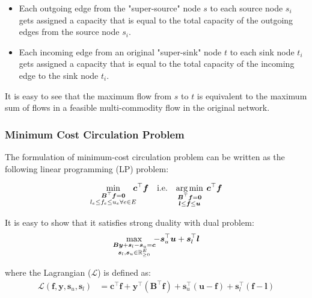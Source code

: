 \documentclass{article} %
\theoremstyle{bfnote}
\begin{document}
\begin{itemize}
	\item Each outgoing edge from the "super-source" node $s$ to each source
	node $s_i$ gets assigned a capacity that is equal to the total capacity of the
	outgoing edges from the source node $s_i$.
	
	\item Each incoming edge from an original "super-sink" node $t$ to each sink
	node $t_i$ gets assigned a capacity that is equal to the total capacity of the
	incoming edge to the sink node $t_i$.
\end{itemize}

It is easy to see that the maximum flow from $s$ to $t$ is equivalent to the maximum sum of flows in a feasible multi-commodity flow in the original network.


\subsubsection{Minimum Cost Circulation Problem}

The formulation of minimum-cost circulation problem can be written as the following linear programming (LP) problem:

\begin{equation}
	\underset{\substack{\bm{B}^{\top} \bm{f}=\bm{0} \\ l_e \leq f_e \leq u_e \forall e \in E}}{\min } \hspace{-4pt} \bm{c}^{\top} \bm{f} \quad  \text{i.e.}	\quad 
	\underset{\substack{\bm{B}^{\top} \bm{f}=\bm{0} \\ \bm{l} \leq \bm{f} \leq \bm{u} }}{\arg \min } \hspace{4pt} \bm{c}^{\top} \bm{f}	
	\label{eq:5}
\end{equation}


It is easy to show that it satisfies strong duality with dual problem:
\begin{equation}
	\max _{\substack{\bm{B} \bm{y}+\bm{s}_{l}-\bm{s}_{u}=\bm{c}\\ \bm{s}_{l}, \bm{s}_{u} \in \mathbb{R}_{\geq 0}^E}} \hspace{-4pt} -\bm{s}_u^{\top} \bm{u}+\bm{s}_l^{\top} \bm{l}
	\label{eq:6}
\end{equation}

where the Lagrangian (\(\mathcal{L}\)) is defined as:
\[
\begin{aligned}
	\mathcal{L}(\bm{f}, \bm{y}, \bm{s}_{u}, \bm{s}_{l}) &= \bm{c}^{\top} \bm{f} + \bm{y}^{\top}(\bm{B}^{\top} \bm{f}) + \bm{s}_u^{\top}(\bm{u} - \bm{f}) + \bm{s}_l^{\top}(\bm{f} - \bm{l})
\end{aligned}
\]
\end{document}
